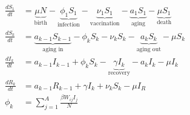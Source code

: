 \begin{align*}

\frac{dS_1}{dt} &= \underbrace{\mu N}_\textrm{birth} - \underbrace{\phi_1 S_1}_\textrm{infection} - \underbrace{\nu_1 S_1}_\textrm{vaccination} - \underbrace{a_1 S_1}_\text{aging} - \underbrace{ \mu S_1 }_\text{death} 

\\

\frac{dS_k}{dt} &= \underbrace{a_{k-1}S_{k-1}}_\text{aging in} - \phi_k S_k -\nu_k S_k - \underbrace{a_k S_k}_\text{aging out} - \mu S_k

\\ 

\frac{dI_k}{dt} &= a_{k-1}I_{k-1} + \phi_k S_k - \underbrace{\gamma I_k}_\text{recovery} - a_k I_k - \mu I_k

\\

\frac{dR_k}{dt} &= a_{k-1}R_{k-1} + \gamma I_k + \nu_k S_k - \mu I_R

\\

\phi_k &= \sum_{j=1}^A \frac{\beta W_{ij} I_j}{N}

\end{align*}